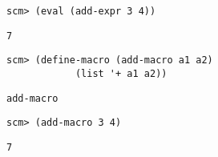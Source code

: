 \begin{blocksection}

\begin{lstlisting}
scm> (eval (add-expr 3 4))
\end{lstlisting}
\begin{solution}[.25in]
\texttt{7}
\end{solution}

\begin{lstlisting}
scm> (define-macro (add-macro a1 a2)
            (list '+ a1 a2))
\end{lstlisting}
\begin{solution}[.25in]
\texttt{add-macro}
\end{solution}

\begin{lstlisting}
scm> (add-macro 3 4)
\end{lstlisting}
\begin{solution}[.25in]
\texttt{7}
\end{solution}
\end{blocksection}
